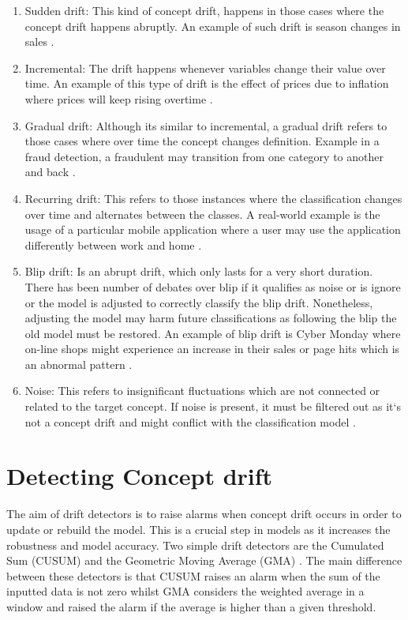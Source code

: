   
   \begin{enumerate}
  \item Sudden drift: This kind of concept drift, happens in those cases where the concept drift happens abruptly. An example of such drift is season changes in sales \citep{Tsymbal04theproblem}.
  \item Incremental: The drift happens whenever variables change their value over time. An example of this type of drift is the effect of prices due to inflation where prices will keep rising overtime \citep{Tsymbal04theproblem}. 
  \item Gradual drift: Although its similar to incremental, a gradual drift refers to those cases where over time the concept changes definition. Example in a fraud detection, a fraudulent may transition from one category to another and back \citep{Tsymbal04theproblem}.
  \item Recurring drift: This refers to those instances where the classification changes over time and alternates between the classes. A real-world example is the usage of a particular mobile application where a user may use the application differently between work and home \citep{Tsymbal04theproblem}. 
  \item Blip drift: Is an abrupt drift, which only lasts for a very short duration. There has been number of debates over blip if it qualifies as noise or is ignore or the model is adjusted to correctly classify the blip drift. Nonetheless, adjusting the model may harm future classifications as following the blip the old model must be restored. An example of blip drift is Cyber Monday where on-line shops might experience an increase in their sales or page hits which is an abnormal pattern \citep{Tsymbal04theproblem}.
  \item Noise: This refers to insignificant fluctuations which are not connected or related to the target concept. If noise is present, it must be filtered out as it`s not a concept drift and might conflict with the classification model \citep{Tsymbal04theproblem}. 
\end{enumerate}

\section{Detecting Concept drift}

The aim of drift detectors is to raise alarms when concept drift occurs in order to update or rebuild the model. This is a crucial step in models as it increases the robustness and model accuracy.  Two simple drift detectors are the Cumulated Sum (CUSUM) \citep{ROSS2012191} and the Geometric Moving Average (GMA) \citep{ROSS2012191}. The main difference between these detectors is that CUSUM raises an alarm when the sum of the inputted data is not zero whilst GMA considers the weighted average in a window and raised the alarm if the average is higher than a given threshold. 

